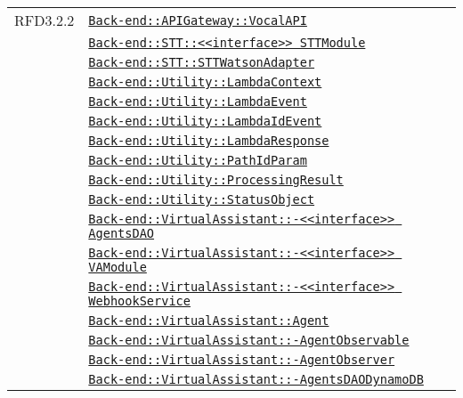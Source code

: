 \begin{longtable}{|>{\centering}m{3cm}|m{10cm}<{\centering}|}
RFD3.2.2 & \hyperref[Back-end::APIGateway::VocalAPI]{\texttt{Back-end::APIGateway::VocalAPI}}\\
& \hyperref[Back-end::STT::<<interface>> STTModule]{\texttt{Back-end::STT::<<interface>> STTModule}}\\
& \hyperref[Back-end::STT::STTWatsonAdapter]{\texttt{Back-end::STT::STTWatsonAdapter}}\\
& \hyperref[Back-end::Utility::LambdaContext]{\texttt{Back-end::Utility::LambdaContext}}\\
& \hyperref[Back-end::Utility::LambdaEvent]{\texttt{Back-end::Utility::LambdaEvent}}\\
& \hyperref[Back-end::Utility::LambdaIdEvent]{\texttt{Back-end::Utility::LambdaIdEvent}}\\
& \hyperref[Back-end::Utility::LambdaResponse]{\texttt{Back-end::Utility::LambdaResponse}}\\
& \hyperref[Back-end::Utility::PathIdParam]{\texttt{Back-end::Utility::PathIdParam}}\\
& \hyperref[Back-end::Utility::ProcessingResult]{\texttt{Back-end::Utility::ProcessingResult}}\\
& \hyperref[Back-end::Utility::StatusObject]{\texttt{Back-end::Utility::StatusObject}}\\
& \hyperref[Back-end::VirtualAssistant::<<interface>> AgentsDAO]{\texttt{Back-end::VirtualAssistant::-\linebreak <<interface>> AgentsDAO}}\\
& \hyperref[Back-end::VirtualAssistant::<<interface>> VAModule]{\texttt{Back-end::VirtualAssistant::-\linebreak <<interface>> VAModule}}\\
& \hyperref[Back-end::VirtualAssistant::<<interface>> WebhookService]{\texttt{Back-end::VirtualAssistant::-\linebreak <<interface>> WebhookService}}\\
& \hyperref[Back-end::VirtualAssistant::Agent]{\texttt{Back-end::VirtualAssistant::Agent}}\\
& \hyperref[Back-end::VirtualAssistant::AgentObservable]{\texttt{Back-end::VirtualAssistant::-\linebreak AgentObservable}}\\
& \hyperref[Back-end::VirtualAssistant::AgentObserver]{\texttt{Back-end::VirtualAssistant::-\linebreak AgentObserver}}\\
& \hyperref[Back-end::VirtualAssistant::AgentsDAODynamoDB]{\texttt{Back-end::VirtualAssistant::-\linebreak AgentsDAODynamoDB}}\\

\end{longtable}
